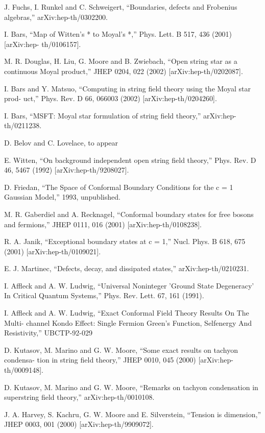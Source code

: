 \documentclass[11pt,a4paper]{ctexart}
\begin{document}
\begin{enumerate}[label={[\arabic*]},leftmargin=*,itemsep=2pt]
\item J. Fuchs, I. Runkel and C. Schweigert, “Boundaries, defects and Frobenius algebras,” arXiv:hep-th/0302200.
\item I. Bars, “Map of Witten’s * to Moyal’s *,” Phys. Lett. B 517, 436 (2001) [arXiv:hep- th/0106157].
\item M. R. Douglas, H. Liu, G. Moore and B. Zwiebach, “Open string star as a continuous Moyal product,” JHEP 0204, 022 (2002) [arXiv:hep-th/0202087].
\item I. Bars and Y. Matsuo, “Computing in string field theory using the Moyal star prod- uct,” Phys. Rev. D 66, 066003 (2002) [arXiv:hep-th/0204260].
\item I. Bars, “MSFT: Moyal star formulation of string field theory,” arXiv:hep-th/0211238.
\item D. Belov and C. Lovelace, to appear
\item E. Witten, “On background independent open string field theory,” Phys. Rev. D 46, 5467 (1992) [arXiv:hep-th/9208027].
\item D. Friedan, “The Space of Conformal Boundary Conditions for the c = 1 Gaussian Model,” 1993, unpublished.
\item M. R. Gaberdiel and A. Recknagel, “Conformal boundary states for free bosons and fermions,” JHEP 0111, 016 (2001) [arXiv:hep-th/0108238].
\item R. A. Janik, “Exceptional boundary states at c = 1,” Nucl. Phys. B 618, 675 (2001) [arXiv:hep-th/0109021].
\item E. J. Martinec, “Defects, decay, and dissipated states,” arXiv:hep-th/0210231.
\item I. Aﬄeck and A. W. Ludwig, “Universal Noninteger ’Ground State Degeneracy’ In Critical Quantum Systems,” Phys. Rev. Lett. 67, 161 (1991).
\item I. Aﬄeck and A. W. Ludwig, “Exact Conformal Field Theory Results On The Multi- channel Kondo Effect: Single Fermion Green’s Function, Selfenergy And Resistivity,” UBCTP-92-029
\item D. Kutasov, M. Marino and G. W. Moore, “Some exact results on tachyon condensa- tion in string field theory,” JHEP 0010, 045 (2000) [arXiv:hep-th/0009148].
\item D. Kutasov, M. Marino and G. W. Moore, “Remarks on tachyon condensation in superstring field theory,” arXiv:hep-th/0010108.
\item J. A. Harvey, S. Kachru, G. W. Moore and E. Silverstein, “Tension is dimension,” JHEP 0003, 001 (2000) [arXiv:hep-th/9909072].

\end{enumerate}
\end{document}
